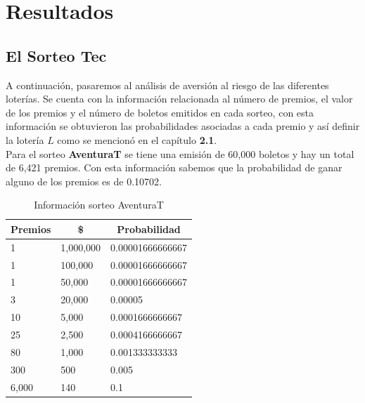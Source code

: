 \chapter{Resultados}


\section{El Sorteo Tec}


\noindent A continuación, pasaremos al análisis de aversión al riesgo de las diferentes loterías. Se cuenta con la información relacionada al número de premios, el valor de los premios y el número de boletos emitidos en cada sorteo, con esta información se obtuvieron las probabilidades asociadas a cada premio y así definir la lotería $L$ como se mencionó en el capítulo \textbf{2.1}. \\

Para el sorteo \textbf{AventuraT} se tiene una emisión de 60,000 boletos y hay un total de 6,421 premios. Con esta información sabemos que la probabilidad de ganar alguno de los premios es de 0.10702.

\begin{table}[H]
\centering
\caption{Información sorteo AventuraT}
\label{tab:avent}
\begin{tabular}{@{}lll@{}}
\toprule
\multicolumn{1}{c}{Premios} & \multicolumn{1}{c}{\$} & \multicolumn{1}{c}{Probabilidad} \\ \midrule
1                           & 1,000,000                & 0.00001666666667                 \\
1                           & 100,000                 & 0.00001666666667                 \\
1                           & 50,000                  & 0.00001666666667                 \\
3                           & 20,000                  & 0.00005                          \\
10                          & 5,000                   & 0.0001666666667                  \\
25                          & 2,500                   & 0.0004166666667                  \\
80                          & 1,000                   & 0.001333333333                   \\
300                         & 500                    & 0.005                            \\
6,000                        & 140                    & 0.1                              \\ \bottomrule
\end{tabular}
\end{table} \\

